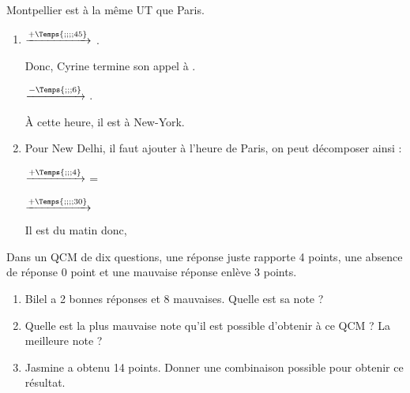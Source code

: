 \begin{Maquette}[Fiche,CorrigeFin,Colonnes=2]{}
\begin{multicols}{2}
      \begin{Solution}
         Montpellier est à la même UT que Paris. \par
         \begin{enumerate}
            \item {} \quad $\xrightarrow{+\Temps{;;;;45}}$ \quad {}. \par
               Donc, Cyrine termine son appel à . \par \smallskip
                \quad $\xrightarrow{-\Temps{;;;6}}$ \quad {}. \par
               À cette heure, il est  à New-York.
            \item Pour New Delhi, il faut ajouter  à l'heure de Paris, on peut décomposer ainsi : \par \smallskip
                \quad $\xrightarrow{+\Temps{;;;4}}$ \quad {} =  \par \smallskip
                \quad $\xrightarrow{+\Temps{;;;;30}}$ \quad {} \par \smallskip
               Il est  du matin donc, 
         \end{enumerate}
      \end{Solution}
      
      
      \begin{exercice} %
         Dans un QCM de dix questions, une réponse juste rapporte 4 points, une absence de réponse 0 point et une mauvaise réponse enlève 3 points.
         \begin{enumerate}
            \item Bilel a 2 bonnes réponses et 8 mauvaises. Quelle est sa note ?
            \item Quelle est la plus mauvaise note qu'il est possible d'obtenir à ce QCM ? La meilleure note ?
            \item Jasmine a obtenu 14 points. Donner une combinaison possible pour obtenir ce résultat.
         \end{enumerate}
      \end{exercice}
      

\end{multicols}
\end{Maquette}
